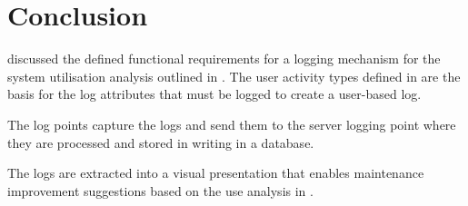 \section{Conclusion}
 discussed the defined functional requirements for a logging mechanism for the system utilisation analysis outlined in . The user activity types defined in  are the basis for the log attributes that must be logged to create a user-based log. \par The log points capture the logs and send them to the server logging point where they are processed and stored in writing in a database.\par The logs are extracted into a visual presentation that enables maintenance improvement suggestions based on the use analysis in .